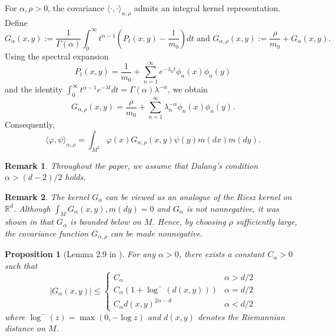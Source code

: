 \documentclass[12pt]{amsart}
\newtheorem{prop}{Proposition}[section]
\newtheorem{remark}{Remark}[section]
\numberwithin{equation}{section}
\newcommand{\R}{\mathbb{R}}
\newcommand{\1}{\mathbf{1}}
\begin{document}
For $\alpha,\rho>0$, the covariance $\langle\cdot,\cdot\rangle_{\alpha,\rho}$ admits an integral kernel representation. Define
\begin{equation*}
G_{\alpha}(x,y):=\frac{1}{\Gamma(\alpha)}\int_0^\infty t^{\alpha-1} \left(P_t(x,y)-\frac{1}{m_0}\right)dt\text{ and }G_{\alpha,\rho}(x,y):=\frac{\rho}{m_0} + G_{\alpha}(x,y).
\end{equation*}
Using the spectral expansion
\begin{equation*}
    P_t(x,y) = \frac{1}{m_0}+\sum_{n=1}^\infty e^{-\lambda_nt}\phi_n(x)\phi_n(y)
\end{equation*}
and the identity $\int_0^\infty t^{\alpha-1}e^{-\lambda t}dt=\Gamma(\alpha)\lambda^{-\alpha}$, we obtain
\begin{equation*}
    G_{\alpha,\rho}(x,y)=\frac{\rho}{m_0}+\sum_{n=1}^\infty\lambda_n^{-\alpha}\phi_n(x)\phi_n(y).
\end{equation*}
Consequently,
\begin{equation}
\label{covker}
\langle\varphi,\psi\rangle_{\alpha,\rho}=\int_{M^2}\varphi(x)G_{\alpha,\rho}(x,y)\psi(y)m(dx)m(dy).
\end{equation}

\begin{remark}
    Throughout the paper, we assume that Dalang’s condition $\alpha>(d-2)/2$ holds.
\end{remark}

\begin{remark}
The kernel $G_\alpha$ can be viewed as an analogue of the Riesz kernel on $\R^d$. Although $\int_M G_\alpha(x,y),m(dy)=0$ and $G_\alpha$ is not nonnegative, it was shown in \cite{chen2025parabolic} that $G_\alpha$ is bounded below on $M$. Hence, by choosing $\rho$ sufficiently large, the covariance function $G_{\alpha,\rho}$ can be made nonnegative.
\end{remark}

\begin{prop}[Lemma 2.9 in \cite{brosamler1983laws}]
\label{covker_bound}
For any $\alpha>0$, there exists a constant $C_\alpha>0$ such that
\begin{equation*}
\vert G_{\alpha}(x,y)\vert\leq\begin{cases}
    C_{\alpha} &\alpha>d/2\\
    C_{\alpha}(1+\log^-(d(x,y))) &\alpha=d/2\\
    C_{\alpha} d(x,y)^{2\alpha-d} &\alpha<d/2
\end{cases}
\end{equation*}
where $\log^-(z)=\max(0,-\log z)$ and $d(x,y)$ denotes the Riemannian distance on $M$.
\end{prop}
\end{document}
